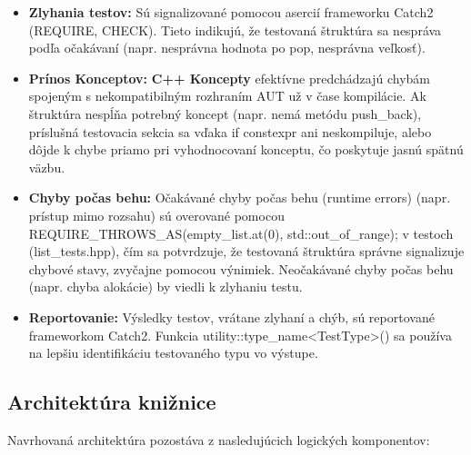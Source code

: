 \documentclass[11pt]{article}
\begin{document}
\begin{itemize}
    \item \textbf{Zlyhania testov:} Sú signalizované pomocou asercií frameworku Catch2 (REQUIRE, CHECK). Tieto indikujú, že testovaná štruktúra sa nespráva podľa očakávaní (napr. nesprávna hodnota po pop, nesprávna veľkosť).
    \item \textbf{Prínos Konceptov:} \textbf{C++ Koncepty} efektívne predchádzajú chybám spojeným s nekompatibilným rozhraním AUT už v čase kompilácie. Ak štruktúra nespĺňa potrebný koncept (napr. nemá metódu push\_back), príslušná testovacia sekcia sa vďaka if constexpr ani neskompiluje, alebo dôjde k chybe priamo pri vyhodnocovaní konceptu, čo poskytuje jasnú spätnú väzbu.
    \item \textbf{Chyby počas behu:} Očakávané chyby počas behu (runtime errors) (napr. prístup mimo rozsahu) sú overované pomocou REQUIRE\_THROWS\_AS(empty\_list.at(0), std::out\_of\_range); v testoch (list\_tests.hpp), čím sa potvrdzuje, že testovaná štruktúra správne signalizuje chybové stavy, zvyčajne pomocou výnimiek. Neočakávané chyby počas behu (napr. chyba alokácie) by viedli k zlyhaniu testu.
    \item \textbf{Reportovanie:} Výsledky testov, vrátane zlyhaní a chýb, sú reportované frameworkom Catch2. Funkcia utility::type\_name<TestType>() sa používa na lepšiu identifikáciu testovaného typu vo výstupe.
\end{itemize}

\subsection{Architektúra knižnice}

Navrhovaná architektúra pozostáva z nasledujúcich logických komponentov:
\end{document}
